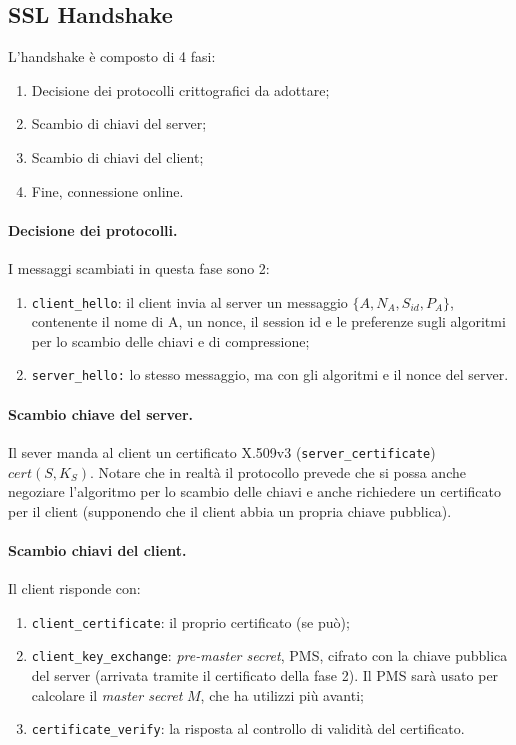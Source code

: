 \documentclass[a4paper, 10pt, twoside]{article}
\begin{document}
	\subsection{SSL Handshake}
	L'handshake è composto di 4 fasi: \begin{enumerate}
		\item Decisione dei protocolli crittografici da adottare;
		\item Scambio di chiavi del server;
		\item Scambio di chiavi del client;
		\item Fine, connessione online.
	\end{enumerate}

	\paragraph{Decisione dei protocolli.} I messaggi scambiati in questa fase sono 2: \begin{enumerate}
		\item \lstinline{client_hello}: il client invia al server un messaggio $\lbrace A, N_A, S_{id}, P_A\rbrace$, contenente il nome di A, un nonce, il session id e le preferenze sugli algoritmi per lo scambio delle chiavi e di compressione;
		\item \lstinline{server_hello:} lo stesso messaggio, ma con gli algoritmi e il nonce del server.
	\end{enumerate}

	\paragraph{Scambio chiave del server.} Il sever manda al client un certificato X.509v3 (\lstinline{server_certificate}) $cert(S, K_S)$. Notare che in realtà il protocollo prevede che si possa anche negoziare l'algoritmo per lo scambio delle chiavi e anche richiedere un certificato per il client (supponendo che il client abbia un propria chiave pubblica).

	\paragraph{Scambio chiavi del client.} Il client risponde con: \begin{enumerate}
		\item \lstinline{client_certificate}: il proprio certificato (se può);
		\item \lstinline{client_key_exchange}: \textit{pre-master secret}, PMS, cifrato con la chiave pubblica del server (arrivata tramite il certificato della fase 2). Il PMS sarà usato per calcolare il \textit{master secret} $M$, che ha utilizzi più avanti;
		\item \lstinline{certificate_verify}: la risposta al controllo di validità del certificato. 
	\end{enumerate}
\end{document}
